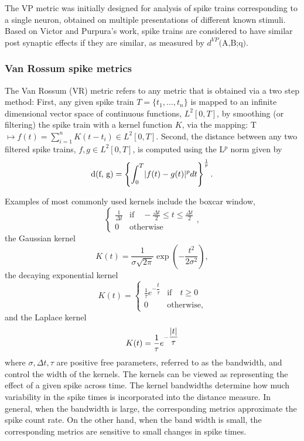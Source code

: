 The VP metric was initially designed for analysis of spike trains corresponding to a single neuron, obtained on multiple presentations of different known stimuli. Based on Victor and Purpura's work, spike trains are considered to have similar post synaptic effects if they are similar, as measured by $\text{$d^{VP}$(A,B;q)}$.



\subsubsection{Van Rossum spike metrics}
The Van Rossum (VR) metric \cite{Rossum2001,houghton2010measuring} refers to any metric that is obtained via a two step method:
First, any given spike train $T = \{t_{1}, \ldots, t_{n} \}$ is mapped to an infinite dimensional vector space of continuous functions, $L^{2}[0, T]$, by smoothing (or filtering) the spike train with a kernel function $K$, via the mapping:
T $\displaystyle \mapsto f(t) = \sum_{i=1}^{n} K(t-t_{i}) \in L^{2}[0, T].$
Second, the distance between any two filtered spike trains, $f, g \in L^{2}[0,T]$, is computed using the L$^{p}$ norm given by
\begin{equation}\label{LpNorm}
\text{d(f, g)} = 
\displaystyle \left \{ \int_{0}^{T} \lvert f(t) - g(t)\rvert^{p} dt 
\right \}^{\frac{1}{p}}.
\end{equation}

Examples of most commonly used kernels include the boxcar window,
\[   
\begin{cases} 
    \frac{1}{\Delta t} & \text{if} \quad  -\frac{\Delta t}{2} \leq t \leq \frac{\Delta t}{2} \\
0 & \text{otherwise}        
\end{cases},
\]
the Gaussian kernel
\[
K(t) = \frac{1}{\sigma \sqrt{2\pi}} \exp(-\dfrac{t^{2}}{2\sigma^2}),
\]
the decaying exponential kernel
\[
K(t) = \begin{cases} 
    \frac{1}{\tau}e^{-\dfrac{t}{\tau}} & \text{if} \quad t \geq 0  \\
0 & \text{otherwise},        
\end{cases}
\]
and the Laplace kernel
\[
K(t) = \frac{1}{\tau}e^{-\dfrac{\lvert t\rvert}{\tau}}  
\]
where $\sigma, \Delta t, \tau$ are positive free parameters, referred to as the bandwidth, and control the width of the kernels.
The kernels can be viewed as representing the effect of a given spike across time. The kernel bandwidths determine how much variability in the spike times is incorporated into the distance measure. In general, when the bandwidth is large, the corresponding metrics approximate
the spike count rate. On the other hand, when the band width is small, the corresponding metrics are sensitive to small changes in spike times.





